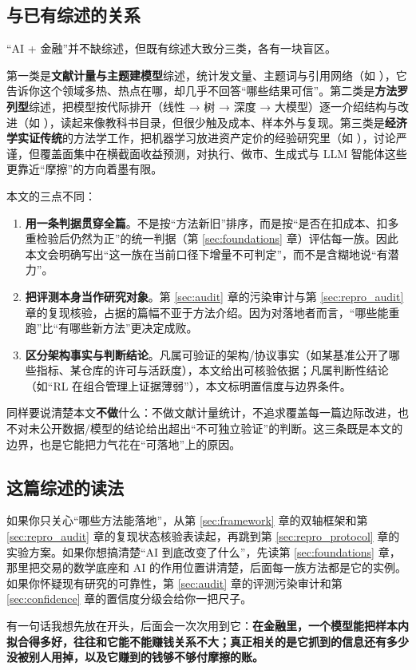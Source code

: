 \subsection{与已有综述的关系}\label{sec:positioning}

“AI + 金融”并不缺综述，但既有综述大致分三类，各有一块盲区。

第一类是\textbf{文献计量与主题建模型}综述，统计发文量、主题词与引用网络（如 \cite{mltopic2021}），它告诉你这个领域多热、热点在哪，却几乎不回答“哪些结果可信”。第二类是\textbf{方法罗列型}综述，把模型按代际排开（线性 → 树 → 深度 → 大模型）逐一介绍结构与改进（如 \cite{sezer2020survey}），读起来像教科书目录，但很少触及成本、样本外与复现。第三类是\textbf{经济学实证传统}的方法学工作，把机器学习放进资产定价的经验研究里（如 \cite{gukellyxiu2020}），讨论严谨，但覆盖面集中在横截面收益预测，对执行、做市、生成式与 LLM 智能体这些更靠近“摩擦”的方向着墨有限。

本文的三点不同：

\begin{enumerate}
  \item \textbf{用一条判据贯穿全篇}。不是按“方法新旧”排序，而是按“是否在扣成本、扣多重检验后仍然为正”的统一判据（第 \ref{sec:foundations} 章）评估每一族。因此本文会明确写出“这一族在当前口径下增量不可判定”，而不是含糊地说“有潜力”。
  \item \textbf{把评测本身当作研究对象}。第 \ref{sec:audit} 章的污染审计与第 \ref{sec:repro_audit} 章的复现核验，占据的篇幅不亚于方法介绍。因为对落地者而言，“哪些能重跑”比“有哪些新方法”更决定成败。
  \item \textbf{区分架构事实与判断结论}。凡属可验证的架构/协议事实（如某基准公开了哪些指标、某仓库的许可与活跃度），本文给出可核验依据；凡属判断性结论（如“RL 在组合管理上证据薄弱”），本文标明置信度与边界条件。
\end{enumerate}

同样要说清楚本文\textbf{不做}什么：不做文献计量统计，不追求覆盖每一篇边际改进，也不对未公开数据/模型的结论给出超出“不可独立验证”的判断。这三条既是本文的边界，也是它能把力气花在“可落地”上的原因。

\subsection{这篇综述的读法}

如果你只关心“哪些方法能落地”，从第 \ref{sec:framework} 章的双轴框架和第 \ref{sec:repro_audit} 章的复现状态核验表读起，再跳到第 \ref{sec:repro_protocol} 章的实验方案。如果你想搞清楚“AI 到底改变了什么”，先读第 \ref{sec:foundations} 章，那里把交易的数学底座和 AI 的作用位置讲清楚，后面每一族方法都是它的实例。如果你怀疑现有研究的可靠性，第 \ref{sec:audit} 章的评测污染审计和第 \ref{sec:confidence} 章的置信度分级会给你一把尺子。

有一句话我想先放在开头，后面会一次次用到它：\textbf{在金融里，一个模型能把样本内拟合得多好，往往和它能不能赚钱关系不大；真正相关的是它抓到的信息还有多少没被别人用掉，以及它赚到的钱够不够付摩擦的账。}
